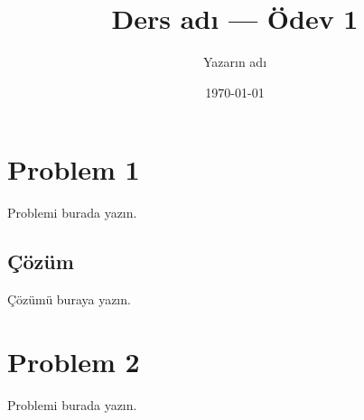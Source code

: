 \documentclass[11pt]{article}
\title{Ders adı — Ödev 1}
\author{Yazarın adı}
\date{\today}
\begin{document}
\maketitle

\section*{Problem 1}
Problemi burada yazın.

\subsection*{Çözüm}
Çözümü buraya yazın.

\section*{Problem 2}
Problemi burada yazın.
\end{document}
